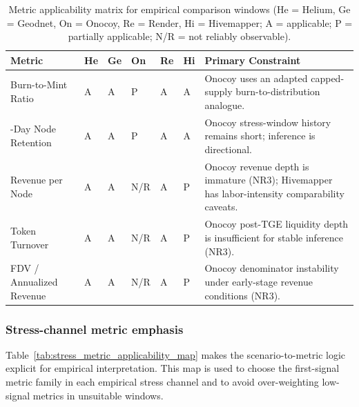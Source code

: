 \begin{table}[ht]
    \centering
    \small
    \renewcommand{\arraystretch}{1.2}
    \setlength{\tabcolsep}{4pt}
    \begin{tabularx}{\textwidth}{@{}>{\raggedright\arraybackslash}p{}>{\centering\arraybackslash}p{}>{\centering\arraybackslash}p{}>{\centering\arraybackslash}p{}>{\centering\arraybackslash}p{}>{\centering\arraybackslash}p{}X@{}}
        \toprule
        \textbf{Metric} & \textbf{He} & \textbf{Ge} & \textbf{On} & \textbf{Re} & \textbf{Hi} & \textbf{Primary Constraint} \\
        \midrule
        Burn-to-Mint Ratio & A & A & P & A & A & Onocoy uses an adapted capped-supply burn-to-distribution analogue. \\
        30-Day Node Retention & A & A & P & A & A & Onocoy stress-window history remains short; inference is directional. \\
        Revenue per Node & A & A & N/R & A & P & Onocoy revenue depth is immature (NR3); Hivemapper has labor-intensity comparability caveats. \\
        Token Turnover & A & A & N/R & A & P & Onocoy post-TGE liquidity depth is insufficient for stable inference (NR3). \\
        FDV / Annualized Revenue & A & A & N/R & A & P & Onocoy denominator instability under early-stage revenue conditions (NR3). \\
        \bottomrule
    \end{tabularx}
    \caption{Metric applicability matrix for empirical comparison windows (He = Helium, Ge = Geodnet, On = Onocoy, Re = Render, Hi = Hivemapper; A = applicable; P = partially applicable; N/R = not reliably observable).}
    \label{tab:metric_applicability_matrix}
\end{table}

\subsubsection{Stress-channel metric emphasis}
Table~\ref{tab:stress_metric_applicability_map} makes the scenario-to-metric logic explicit for empirical interpretation. This map is used to choose the first-signal metric family in each empirical stress channel and to avoid over-weighting low-signal metrics in unsuitable windows.

